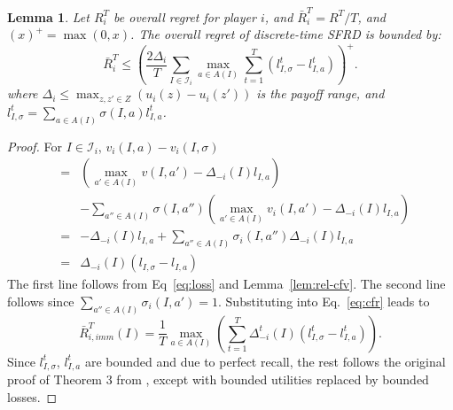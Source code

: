 \documentclass{aamas2014}
\newcommand{\cI}{\mathcal{I}}
\newtheorem{lemma}{Lemma}
\begin{document}
\begin{lemma}
\label{lem:cfr}
Let $R^T_i$ be overall regret for player $i$, and $\bar{R}^T_i = R^T / T$, and $(x)^+ = \max(0,x)$. The overall regret of  
discrete-time SFRD is bounded by: 
\[
\bar{R}^T_i \le \left( \frac{2 \Delta_i}{T} \sum_{ I \in \cI_i} \max_{a \in A(I)} \sum_{t=1}^T ( l^t_{I,\sigma} - l^t_{I,a}) \right)^+. 
\]
where $\Delta_i \le \max_{z,z' \in Z} ( u_i(z) - u_i(z') )$ is the payoff range, 
and $l^t_{I,\sigma} = \sum_{a \in A(I)} \sigma(I,a) l^t_{I,a}$.
\end{lemma}
\begin{proof}
For $I \in \cI_i$, $v_i(I,a) - v_i(I,\sigma)$
\begin{eqnarray*}
 & = &   (\max_{a' \in A(I)} v(I,a') - \Delta_{-i}(I) l_{I,a})\\
 &   & - \sum_{a'' \in A(I)} \sigma(I,a'') \left( \max_{a' \in A(I)} v_i(I,a') - \Delta_{-i}(I) l_{I,a} \right) \\ 
 & = & - \Delta_{-i}(I) l_{I,a} + \sum_{a'' \in A(I)} \sigma_i(I,a'') \Delta_{-i}(I) l_{I,a}\\
 & = & \Delta_{-i}(I) ( l_{I,\sigma} - l_{I,a} ) 
\end{eqnarray*}
The first line follows from Eq~\ref{eq:loss} and Lemma~\ref{lem:rel-cfv}.
The second line follows since $\sum_{a'' \in A(I)} \sigma_i(I,a') = 1$. Substituting into Eq.~\ref{eq:cfr} leads to
\begin{equation}
\label{eq:pw-immreg}
\bar{R}^T_{i,imm}(I)  =  \frac{1}{T} \max_{a \in A(I)} \left( \sum_{t=1}^T \Delta^t_{-i}(I) (l^t_{I,\sigma} - l^t_{I,a}) \right). 
\end{equation}
Since $l^t_{I,\sigma}$, $l^t_{I,a}$ are bounded and due to perfect recall, the rest follows  
the original proof of Theorem 3 from \cite{CFR}, except with bounded utilities replaced by bounded losses. 
\end{proof}
\end{document}
